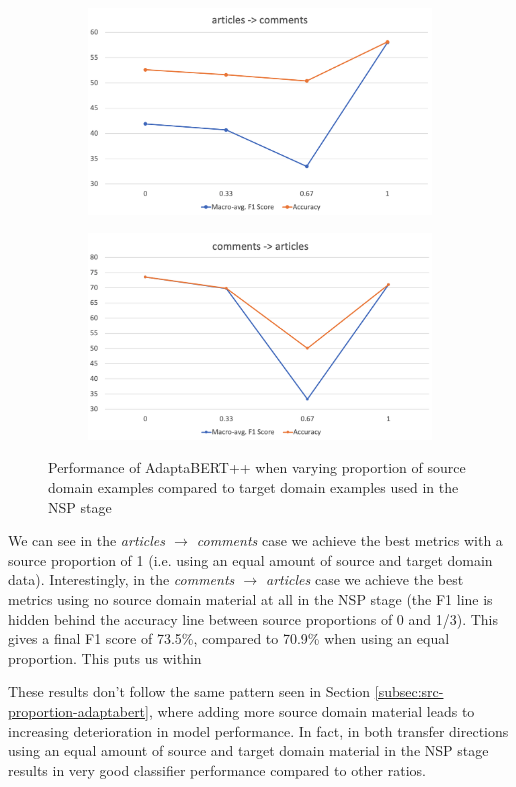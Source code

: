 \begin{figure}[ht]
    \centering
    \begin{subfigure}{\textwidth}
        \centering
        \includegraphics[scale=0.24]{0-img/ner-src-proportion-articles-comments.png}
    \end{subfigure}
    \begin{subfigure}{\textwidth}
        \centering
        \includegraphics[scale=0.24]{0-img/ner-src-proportion-comments-articles.png}
    \end{subfigure}
    \caption{Performance of AdaptaBERT++ when varying proportion of source domain examples compared to target domain examples used in the NSP stage}
    \label{fig:ner-src-proportion}
\end{figure}

We can see in the \textit{articles $ \rightarrow $ comments} case we achieve the best metrics with a source proportion of 1 (i.e. using an equal amount of source and target domain data). Interestingly, in the \textit{comments $ \rightarrow $ articles} case we achieve the best metrics using no source domain material at all in the NSP stage (the F1 line is hidden behind the accuracy line between source proportions of 0 and 1/3). This gives a final F1 score of 73.5\%, compared to 70.9\% when using an equal proportion. This puts us within 


These results don't follow the same pattern seen in Section \ref{subsec:src-proportion-adaptabert}, where adding more source domain material leads to increasing deterioration in model performance. In fact, in both transfer directions using an equal amount of source and target domain material in the NSP stage results in very good classifier performance compared to other ratios.

